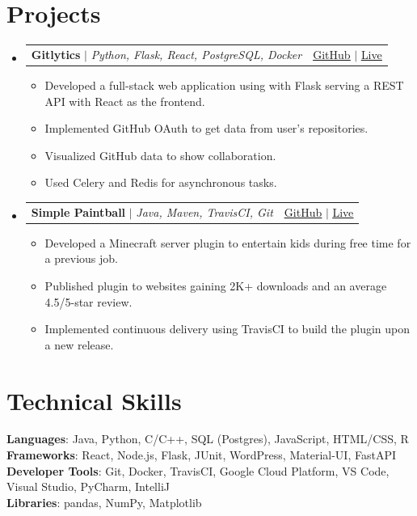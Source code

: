 \documentclass[letterpaper,11pt]{article}
\makeatletter
\newcommand{\resumeItem}[1]{
  \item\small{
    {#1 \vspace{-2pt}}
  }
}
\newcommand{\resumeProjectHeading}[2]{
    \item
    \begin{tabular*}{0.97\textwidth}{l@{\extracolsep{\fill}}r}
      \small#1 & #2 \\
    \end{tabular*}\vspace{-7pt}
}
\newcommand{\resumeSubHeadingListStart}{\begin{itemize}[leftmargin=0.15in, label={}]}
\newcommand{\resumeSubHeadingListEnd}{\end{itemize}}
\newcommand{\resumeItemListStart}{\begin{itemize}}
\newcommand{\resumeItemListEnd}{\end{itemize}\vspace{-5pt}}
\makeatother
\begin{document}
\section{Projects}
    \resumeSubHeadingListStart
      
      \resumeProjectHeading
          {\textbf{Gitlytics} $|$ \emph{Python, Flask, React, PostgreSQL, Docker}}{\href{https://github.com/yourusername/gitlytics}{\underline{GitHub}} $|$ \href{https://gitlytics-live-link.com}{\underline{Live}}}
          \resumeItemListStart
            \resumeItem{Developed a full-stack web application using with Flask serving a REST API with React as the frontend.}
            \resumeItem{Implemented GitHub OAuth to get data from user’s repositories.}
            \resumeItem{Visualized GitHub data to show collaboration.}
            \resumeItem{Used Celery and Redis for asynchronous tasks.}
          \resumeItemListEnd
          
      \resumeProjectHeading
          {\textbf{Simple Paintball} $|$ \emph{Java, Maven, TravisCI, Git}}{\href{https://github.com/yourusername/gitlytics}{\underline{GitHub}} $|$ \href{https://gitlytics-live-link.com}{\underline{Live}}}
          \resumeItemListStart
            \resumeItem{Developed a Minecraft server plugin to entertain kids during free time for a previous job.}
            \resumeItem{Published plugin to websites gaining 2K+ downloads and an average 4.5/5-star review.}
            \resumeItem{Implemented continuous delivery using TravisCI to build the plugin upon a new release.}
          \resumeItemListEnd
          
    \resumeSubHeadingListEnd

\section{Technical Skills}
 \begin{itemize}[leftmargin=0.15in, label={}]
    \small{\item{
     \textbf{Languages}{: Java, Python, C/C++, SQL (Postgres), JavaScript, HTML/CSS, R} \\
     \textbf{Frameworks}{: React, Node.js, Flask, JUnit, WordPress, Material-UI, FastAPI} \\
     \textbf{Developer Tools}{: Git, Docker, TravisCI, Google Cloud Platform, VS Code, Visual Studio, PyCharm, IntelliJ} \\
     \textbf{Libraries}{: pandas, NumPy, Matplotlib}
    }}
 \end{itemize}
\end{document}
